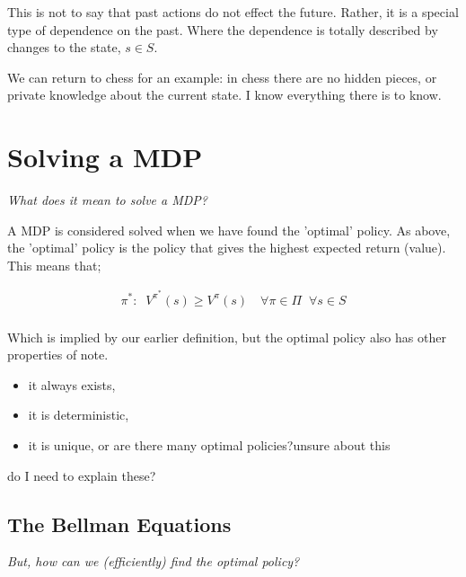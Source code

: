 
This is not to say that past actions do not effect the future. Rather,
it is a special type of dependence on the past. Where the dependence is
totally described by changes to the state, $s\in S$.

We can return to chess for an example: in chess there are no hidden pieces, or
private knowledge about the current state. I know everything there is to know.


\section{Solving a MDP}

\begin{displayquote}
  \textit{What does it mean to solve a MDP?}
\end{displayquote}

A MDP is considered solved when we have found the 'optimal' policy. As above,
the 'optimal' policy is the policy that gives the highest expected return (value).
This means that;

\begin{align*}
\pi^{*} : \;\; V^{\pi^* }(s) \ge V^{\pi}(s) \quad \forall \pi\in \Pi \;\;\forall s\in S\\
\end{align*}

Which is implied by our earlier definition, but the optimal policy also has other properties of note.\cite{Bertsekas1996}

\begin{itemize}
\tightlist
  \item it always exists,
  \item it is deterministic, {}
  \item it is unique, or are there many optimal policies?{\color{red}unsure about this}
\end{itemize}

{\color{red}do I need to explain these?}

\subsection{The Bellman Equations}

\begin{displayquote}
  \textit{But, how can we (efficiently) find the optimal policy?}
\end{displayquote}

